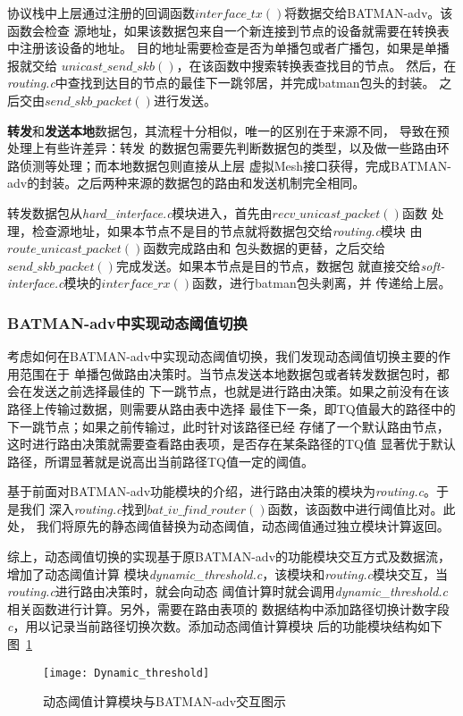 协议栈中上层通过注册的回调函数$interface\_tx()$将数据交给BATMAN-adv。该函数会检查
源地址，如果该数据包来自一个新连接到节点的设备就需要在转换表中注册该设备的地址。
目的地址需要检查是否为单播包或者广播包，如果是单播报就交给
$unicast\_send\_skb()$，在该函数中搜索转换表查找目的节点。
然后，在\emph{routing.c}中查找到达目的节点的最佳下一跳邻居，并完成batman包头的封装。
之后交由$send\_skb\_packet()$进行发送。

\textbf{转发}和\textbf{发送本地}数据包，其流程十分相似，唯一的区别在于来源不同，
导致在预处理上有些许差异：转发
的数据包需要先判断数据包的类型，以及做一些路由环路侦测等处理；而本地数据包则直接从上层
虚拟Mesh接口获得，完成BATMAN-adv的封装。之后两种来源的数据包的路由和发送机制完全相同。

转发数据包从\emph{hard\_interface.c}模块进入，首先由$recv\_unicast\_packet()$函数
处理，检查源地址，如果本节点不是目的节点就将数据包交给\emph{routing.c}模块
由$route\_unicast\_packet()$函数完成路由和
包头数据的更替，之后交给$send\_skb\_packet()$完成发送。如果本节点是目的节点，数据包
就直接交给\emph{soft-interface.c}模块的$interface\_rx()$函数，进行batman包头剥离，并
传递给上层。

\subsubsection{BATMAN-adv中实现动态阈值切换}
考虑如何在BATMAN-adv中实现动态阈值切换，我们发现动态阈值切换主要的作用范围在于
单播包做路由决策时。当节点发送本地数据包或者转发数据包时，都会在发送之前选择最佳的
下一跳节点，也就是进行路由决策。如果之前没有在该路径上传输过数据，则需要从路由表中选择
最佳下一条，即TQ值最大的路径中的下一跳节点；如果之前传输过，此时针对该路径已经
存储了一个默认路由节点，这时进行路由决策就需要查看路由表项，是否存在某条路径的TQ值
显著优于默认路径，所谓显著就是说高出当前路径TQ值一定的阈值。

基于前面对BATMAN-adv功能模块的介绍，进行路由决策的模块为\emph{routing.c}。于是我们
深入\emph{routing.c}找到$bat\_iv\_find\_router()$函数，该函数中进行阈值比对。此处，
我们将原先的静态阈值替换为动态阈值，动态阈值通过独立模块计算返回。

综上，动态阈值切换的实现基于原BATMAN-adv的功能模块交互方式及数据流，增加了动态阈值计算
模块\emph{dynamic\_threshold.c}，该模块和\emph{routing.c}模块交互，当\emph{routing.c}进行路由决策时，就会向动态
阈值计算时就会调用\emph{dynamic\_threshold.c}相关函数进行计算。另外，需要在路由表项的
数据结构中添加路径切换计数字段\emph{c}，用以记录当前路径切换次数。添加动态阈值计算模块
后的功能模块结构如下图~\ref{fig:dynamic_threshold}
\begin{figure}[H] %
  \centering
  \texttt{[image: Dynamic\_threshold]}
  \caption{动态阈值计算模块与BATMAN-adv交互图示}
  \label{fig:dynamic_threshold}
\end{figure}

